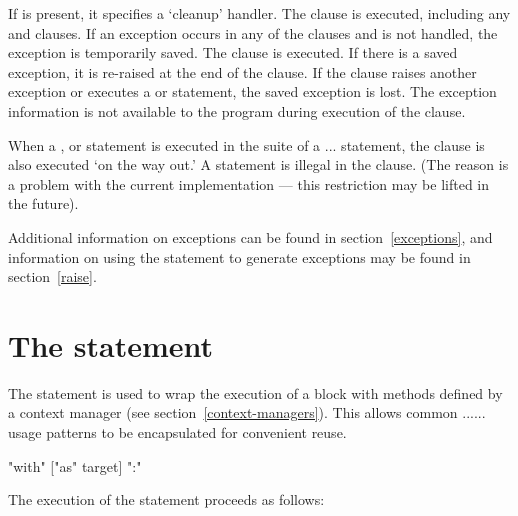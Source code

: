 If  is present, it specifies a `cleanup' handler.  The
 clause is executed, including any  and
 clauses.  If an exception occurs in any of the clauses
and is not handled, the exception is temporarily saved. The
 clause is executed.  If there is a saved exception,
it is re-raised at the end of the  clause.
If the  clause raises another exception or
executes a  or  statement, the saved
exception is lost.  The exception information is not available to the
program during execution of the  clause.

When a ,  or  statement is
executed in the  suite of a ...
statement, the  clause is also executed `on the way out.' A
 statement is illegal in the  clause.
(The reason is a problem with the current implementation --- this
restriction may be lifted in the future).

Additional information on exceptions can be found in
section~\ref{exceptions}, and information on using the 
statement to generate exceptions may be found in section~\ref{raise}.


\section{The  statement\label{with}}


The  statement is used to wrap the execution of a block
with methods defined by a context manager (see
section~\ref{context-managers}). This allows common
...... usage patterns to
be encapsulated for convenient reuse.

\begin{productionlist}
  {"with"  ["as" target] ":" }
\end{productionlist}

The execution of the  statement proceeds as follows:

